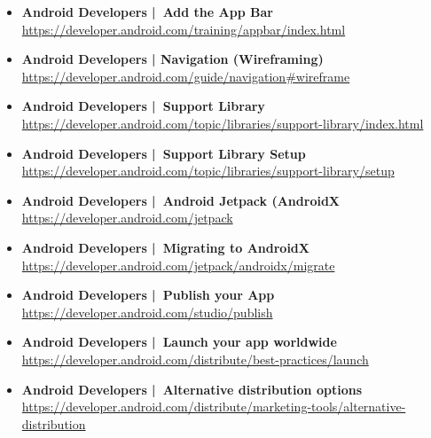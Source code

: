 \documentclass[a4paper]{article}
\begin{document}
\begin{itemize}
			\item \textbf{Android Developers | Add the App Bar}\\
			\href{https://developer.android.com/training/appbar/index.html}
			{https://developer.android.com/training/appbar/index.html}
			
			\item \textbf{Android Developers | Navigation (Wireframing)}\\
			\href{https://developer.android.com/guide/navigation#wireframe}
			{https://developer.android.com/guide/navigation\#wireframe}
			
			\item \textbf{Android Developers | Support Library}\\
			\href{https://developer.android.com/topic/libraries/support-library/index.html}
			{https://developer.android.com/topic/libraries/support-library/index.html}
			
			\item \textbf{Android Developers | Support Library Setup}\\
			\href{https://developer.android.com/topic/libraries/support-library/setup}
			{https://developer.android.com/topic/libraries/support-library/setup}
			
			\item \textbf{Android Developers | Android Jetpack (AndroidX}\\
			\href{https://developer.android.com/jetpack}
			{https://developer.android.com/jetpack}
			
			\item \textbf{Android Developers | Migrating to AndroidX}\\
			\href{https://developer.android.com/jetpack/androidx/migrate}
			{https://developer.android.com/jetpack/androidx/migrate}
			
			\item \textbf{Android Developers | Publish your App}\\
			\href{https://developer.android.com/studio/publish}
			{https://developer.android.com/studio/publish}
			
			\item \textbf{Android Developers | Launch your app worldwide}\\
			\href{https://developer.android.com/distribute/best-practices/launch}
			{https://developer.android.com/distribute/best-practices/launch}
			
			\item \textbf{Android Developers | Alternative distribution options}\\
			\href{https://developer.android.com/distribute/marketing-tools/alternative-distribution}
			{https://developer.android.com/distribute/marketing-tools/alternative-distribution}
			

\end{itemize}
\end{document}
